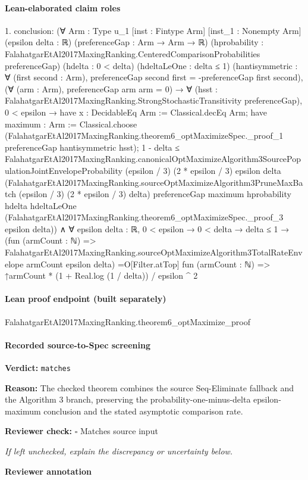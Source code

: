 \documentclass[10pt]{article}
\newcommand{\reviewerbox}{%
  \par\noindent\fbox{\parbox{0.96\linewidth}{\rule{0pt}{0.38in}}}\par
}
\newcommand{\reviewmatch}[1]{%
  \par\noindent\textbf{Reviewer check:} $\square$\; #1\par
  \noindent\emph{If left unchecked, explain the discrepancy or uncertainty below.}\par
}
\begin{document}
\paragraph{Lean-elaborated claim roles}\begin{ReviewVerbatim}
1. conclusion: (∀ {Arm : Type u_1} [inst : Fintype Arm] [inst_1 : Nonempty Arm] (epsilon delta : ℝ) (preferenceGap : Arm → Arm → ℝ)
    (hprobability : FalahatgarEtAl2017MaxingRanking.CenteredComparisonProbabilities preferenceGap) (hdelta : 0 < delta)
    (hdeltaLeOne : delta ≤ 1)
    (hantisymmetric : ∀ (first second : Arm), preferenceGap second first = -preferenceGap first second),
    (∀ (arm : Arm), preferenceGap arm arm = 0) →
      ∀ (hsst : FalahatgarEtAl2017MaxingRanking.StrongStochasticTransitivity preferenceGap),
        0 < epsilon →
          have x : DecidableEq Arm := Classical.decEq Arm;
          have maximum : Arm :=
            Classical.choose
              (FalahatgarEtAl2017MaxingRanking.theorem6_optMaximizeSpec._proof_1 preferenceGap hantisymmetric hsst);
          1 - delta ≤
            FalahatgarEtAl2017MaxingRanking.canonicalOptMaximizeAlgorithm3SourcePopulationJointEnvelopeProbability
              (epsilon / 3) (2 * epsilon / 3) epsilon delta
              (FalahatgarEtAl2017MaxingRanking.sourceOptMaximizeAlgorithm3PruneMaxBatch (epsilon / 3) (2 * epsilon / 3)
                delta)
              preferenceGap maximum hprobability hdelta hdeltaLeOne
              (FalahatgarEtAl2017MaxingRanking.theorem6_optMaximizeSpec._proof_3 epsilon delta)) ∧
  ∀ {epsilon delta : ℝ},
    0 < epsilon →
      0 < delta →
        delta ≤ 1 →
          (fun (armCount : ℕ) =>
              FalahatgarEtAl2017MaxingRanking.sourceOptMaximizeAlgorithm3TotalRateEnvelope armCount epsilon
                delta) =O[Filter.atTop]
            fun (armCount : ℕ) => ↑armCount * (1 + Real.log (1 / delta)) / epsilon ^ 2
\end{ReviewVerbatim}

\paragraph{Lean proof endpoint (built separately)}\begin{ReviewVerbatim}
FalahatgarEtAl2017MaxingRanking.theorem6_optMaximize_proof
\end{ReviewVerbatim}

\paragraph{Recorded source-to-Spec screening}
\textbf{Verdict:} \texttt{matches}
\\
{\raggedright
\textbf{Reason:} The checked theorem combines the source Seq-\allowbreak{}Eliminate fallback and the Algorithm 3 branch, preserving the probability-\allowbreak{}one-\allowbreak{}minus-\allowbreak{}delta epsilon-\allowbreak{}maximum conclusion and the stated asymptotic comparison rate.\allowbreak{}
\par}
\reviewmatch{Matches source input}
\noindent\textbf{Reviewer annotation}\par
\reviewerbox
\clearpage
\hypertarget{source-claim-eddfb104f13a8567}{}
\end{document}
